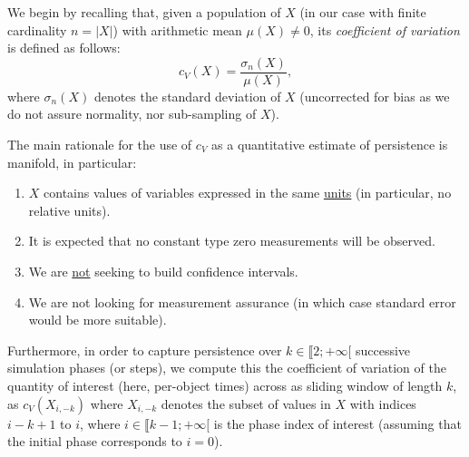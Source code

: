 We begin by recalling that,  given a population of $X$ (in our case
with finite cardinality $n=\lvert{X}\rvert$) with arithmetic mean
$\mu(X)\neq0$, its \emph{coefficient of variation} is
defined as follows:
\[
c_V(X) = \frac{\sigma_{n}(X)}{\mu(X)},
\]
where $\sigma_{n}(X)$ denotes the standard deviation of $X$
(uncorrected for bias as we do not assure normality, nor 
sub-sampling of $X$). 

The main rationale for the use of $c_V$ as a quantitative estimate of
persistence is manifold, in particular:
\begin{enumerate}
\item
$X$ contains values of variables expressed in the same \underline{units} (in particular, no relative units).
\item
It is expected that no constant type zero measurements will be observed.
\item
We are \underline{not} seeking to build confidence intervals.
\item
We are not looking for measurement assurance (in which case standard
error would be more suitable).
\end{enumerate}

Furthermore, in order to capture persistence over
$k\in\llbracket2;+\infty[$ successive simulation phases (or steps), we
compute this the coefficient of variation of the quantity of interest
(here, per-object times) across as sliding window of length $k$, as
$c_V(X_{i,-k})$ where $X_{i,-k}$ denotes 
the subset of values in $X$ with indices $i-k+1$ to $i$, where
$i\in\llbracket{k-1};+\infty[$ is the phase index of interest
(assuming that the initial phase corresponds to $i=0$).
